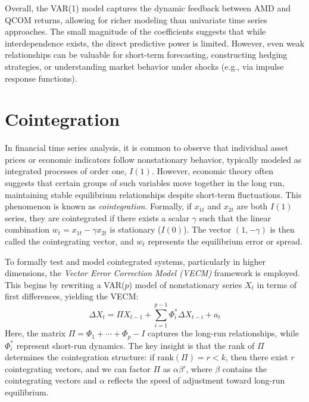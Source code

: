 \documentclass[12pt]{article}
\begin{document}
Overall, the VAR(1) model captures the dynamic feedback between AMD and QCOM returns, allowing for richer modeling than univariate time series approaches. The small magnitude of the coefficients suggests that while interdependence exists, the direct predictive power is limited. However, even weak relationships can be valuable for short-term forecasting, constructing hedging strategies, or understanding market behavior under shocks (e.g., via impulse response functions). 

\section*{Cointegration}

In financial time series analysis, it is common to observe that individual asset prices or economic indicators follow nonstationary behavior, typically modeled as integrated processes of order one, \( I(1) \). However, economic theory often suggests that certain groups of such variables move together in the long run, maintaining stable equilibrium relationships despite short-term fluctuations. This phenomenon is known as \textit{cointegration}. Formally, if \( x_{1t} \) and \( x_{2t} \) are both \( I(1) \) series, they are cointegrated if there exists a scalar \( \gamma \) such that the linear combination \( w_t = x_{1t} - \gamma x_{2t} \) is stationary (\( I(0) \)). The vector \( (1, -\gamma) \) is then called the cointegrating vector, and \( w_t \) represents the equilibrium error or spread.

To formally test and model cointegrated systems, particularly in higher dimensions, the \textit{Vector Error Correction Model (VECM)} framework is employed. This begins by rewriting a VAR(\(p\)) model of nonstationary series \( X_t \) in terms of first differences, yielding the VECM:
\begin{equation}
	\Delta X_t = \Pi X_{t-1} + \sum_{i=1}^{p-1} \Phi_i^* \Delta X_{t-i} + a_t
\end{equation}
Here, the matrix \( \Pi = \Phi_1 + \cdots + \Phi_p - I \) captures the long-run relationships, while \( \Phi_i^* \) represent short-run dynamics. The key insight is that the rank of \( \Pi \) determines the cointegration structure: if \( \text{rank}(\Pi) = r < k \), then there exist \( r \) cointegrating vectors, and we can factor \( \Pi \) as \( \alpha \beta' \), where \( \beta \) contains the cointegrating vectors and \( \alpha \) reflects the speed of adjustment toward long-run equilibrium.
\end{document}
